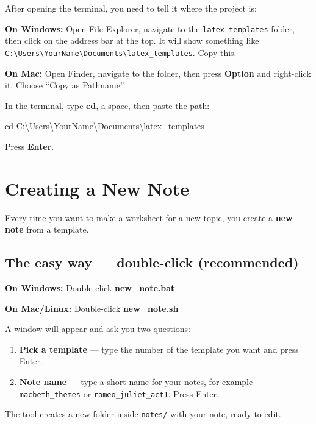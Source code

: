 \documentclass[a4paper,11pt]{article}
\begin{document}
After opening the terminal, you need to tell it where the project is:

\begin{tipbox}
\textbf{On Windows:} Open File Explorer, navigate to the \texttt{latex\_templates} folder, then click on the address bar at the top. It will show something like \texttt{C:\textbackslash Users\textbackslash YourName\textbackslash Documents\textbackslash latex\_templates}. Copy this.

\textbf{On Mac:} Open Finder, navigate to the folder, then press \textbf{Option} and right-click it. Choose ``Copy as Pathname''.
\end{tipbox}

In the terminal, type \textbf{cd}, a space, then paste the path:

\begin{codebox}
{\monofont cd C:\textbackslash Users\textbackslash YourName\textbackslash Documents\textbackslash latex\_templates}
\end{codebox}

Press \textbf{Enter}.

\section{Creating a New Note}
\label{sec:create}

Every time you want to make a worksheet for a new topic, you create a \textbf{new note} from a template.

\subsection{The easy way --- double-click (recommended)}

\begin{stepbox}
\textbf{On Windows:} Double-click \textbf{new\_note.bat}

\textbf{On Mac/Linux:} Double-click \textbf{new\_note.sh}

A window will appear and ask you two questions:
\begin{enumerate}[itemsep=4pt]
  \item \textbf{Pick a template} --- type the number of the template you want and press Enter.
  \item \textbf{Note name} --- type a short name for your notes, for example \texttt{macbeth\_themes} or \texttt{romeo\_juliet\_act1}. Press Enter.
\end{enumerate}

The tool creates a new folder inside \texttt{notes/} with your note, ready to edit.
\end{stepbox}
\end{document}
